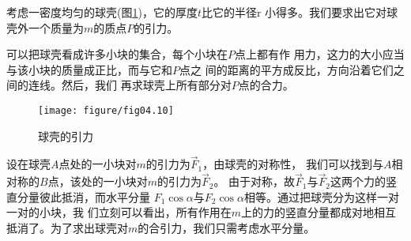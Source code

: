 \documentclass[../outline-of-mechanics.tex]{subfiles}
\begin{document}
考虑一密度均匀的球壳(图\ref{fig:04.10})，它的厚度$ t $比它的半径$ $r
小得多。我们要求出它对球壳外一个质量为$ m $的质点$ P $的引力。

可以把球壳看成许多小块的集合，每个小块在$ P $点上都有作
用力，这力的大小应当与该小块的质量成正比，而与它和$ P $点之
间的距离的平方成反比，方向沿着它们之间的连线。然后，我们
再求球壳上所有部分对$ P $点的合力。
\begin{figure}[h]
  \centering
  \texttt{[image: figure/fig04.10]}
  \caption{球壳的引力}
  \label{fig:04.10}
\end{figure}

设在球壳$ A $点处的一小块对$ m $的引力为$ \vec{F} _ { 1 } $，由球壳的对称性，
我们可以找到与$ A $相对称的$ B $点，该处的一小块对$ m $的引力为$ \vec{F} _ { 2 } $。
由于对称，故$ \vec{F} _ { 1 } $与$ \vec{F} _ { 2 } $这两个力的竖直分量彼此抵消，而水平分量
$ F _ { 1 } \cos \alpha $与$ F _ { 2 } \cos \alpha $相等。通过把球壳分为这样一对一对的小块，我
们立刻可以看出，所有作用在$ m $上的力的竖直分量都成对地相互
抵消了。为了求出球壳对$ m $的合引力，我们只需考虑水平分量。
\end{document}
